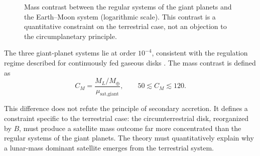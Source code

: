 \documentclass[11pt,a4paper,openany]{report}
\newcommand{\Mt}{M_{\oplus}}
\begin{document}
\begin{figure}[htbp]
\centering
{}
\caption{Mass contrast between the regular systems of the giant planets and the Earth--Moon system
(logarithmic scale). This contrast is a quantitative constraint on the terrestrial case, not an
objection to the circumplanetary principle.}
\label{fig:contraste}
\end{figure}

The three giant-planet systems lie at order $10^{-4}$, consistent with the regulation regime
described for continuously fed gaseous disks \cite{CanupWard2006}. The mass contrast is defined as
\begin{equation}
C_M=\frac{M_L/\Mt}{\mu_{\text{sat,giant}}},
\qquad 50\lesssim C_M\lesssim 120.
\label{eq:CM}
\end{equation}

\begin{controle}
This difference does not refute the principle of secondary accretion. It defines a constraint
specific to the terrestrial case: the circumterrestrial disk, reorganized by $B$, must produce a
satellite mass outcome far more concentrated than the regular systems of the giant planets. The
theory must quantitatively explain why a lunar-mass dominant satellite emerges from the terrestrial
system.
\end{controle}
\end{document}
